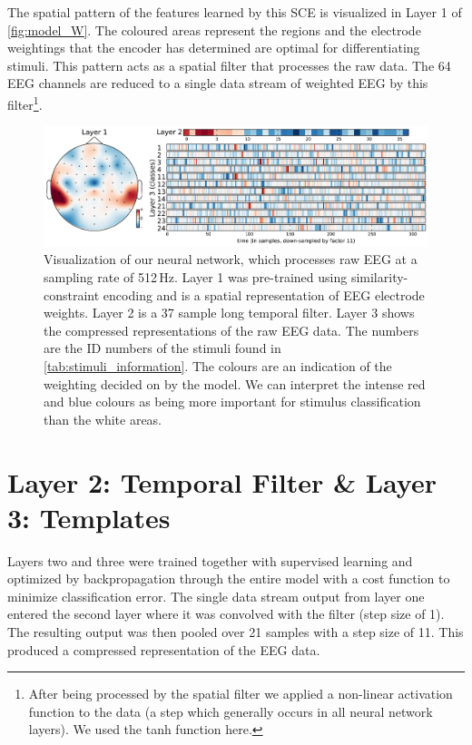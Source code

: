 The spatial pattern of the features learned by this \ac{SCE} is visualized in Layer 1 of \autoref{fig:model_W}. 
The coloured areas represent the regions and the electrode weightings that the encoder has determined are optimal for differentiating stimuli.
This pattern acts as a spatial filter that processes the raw data.
The 64 EEG channels are reduced to a single data stream of weighted EEG by this filter\footnote{After being processed by the spatial filter we applied a non-linear activation function to the data (a step which generally occurs in all neural network layers).
We used the tanh function here.}. 
\begin{figure}[h] 
  \begin{center}
    \includegraphics[width=\textwidth,keepaspectratio=true]{Figures/model_W}
    \caption{Visualization of our neural network, which processes raw EEG at a sampling rate of 512\,Hz.
    Layer 1 was pre-trained using similarity-constraint encoding and is a spatial representation of EEG electrode weights. Layer 2 is a 37 sample long temporal filter. Layer 3 shows the compressed representations of the raw EEG data. The numbers are the ID numbers of the stimuli found in \autoref{tab:stimuli_information}. The colours are an indication of the weighting decided on by the model. We can interpret the intense red and blue colours as being more important for stimulus classification than the white areas.}
    \label{fig:model_W}
  \end{center}
\end{figure}
\section{Layer 2: Temporal Filter \& Layer 3: Templates}
Layers two and three were trained together with supervised learning and optimized by backpropagation through the entire model with a cost function to minimize classification error.
The single data stream output from layer one entered the second layer where it was convolved with the filter (step size of 1).
The resulting output was then pooled over 21 samples with a step size of 11.
This produced a compressed representation of the EEG data.

